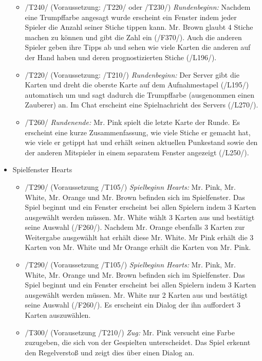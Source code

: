 \documentclass{article}
\begin{document}
\begin{itemize}
\begin{itemize}
		\item /T240/ (Voraussetzung: /T220/ oder /T230/) \textit{Rundenbeginn:} Nachdem eine Trumpffarbe angesagt wurde erscheint ein Fenster indem jeder Spieler die Anzahl seiner Stiche tippen kann. Mr. Brown glaubt 4 Stiche machen zu können und gibt die Zahl ein (/F370/). Auch die anderen Spieler geben ihre Tipps ab und sehen wie viele Karten die anderen auf der Hand haben und deren prognostizierten Stiche (/L196/).

		\item /T220/ (Voraussetzung: /T210/) \textit{Rundenbeginn:} Der Server gibt die Karten und dreht die oberste Karte auf dem Aufnahmestapel (/L195/) automatisch um und sagt dadurch die Trumpffarbe (ausgenommen einen Zauberer) an. Im Chat erscheint eine Spielnachricht des Servers (/L270/).
		
				\item /T260/ \textit{Rundenende:} Mr. Pink spielt die letzte Karte der Runde. Es erscheint eine kurze Zusammenfassung, wie viele Stiche er gemacht hat, wie viele er getippt hat und erhält seinen aktuellen Punkestand sowie den der anderen Mitspieler in einem separatem Fenster angezeigt (/L250/).
					
	\end{itemize}
	
	\item Spielfenster Hearts
	
	\begin{itemize}
	
		\item /T290/ (Voraussetzung /T105/) \textit{Spielbeginn Hearts:} Mr. Pink, Mr. White, Mr. Orange und Mr. Brown befinden sich im Spielfenster. Das Spiel beginnt und ein Fenster erscheint bei allen Spielern indem 3 Karten ausgewählt werden müssen. Mr. White wählt 3 Karten aus und bestätigt seine Auswahl (/F260/). Nachdem Mr. Orange ebenfalls 3 Karten zur Weitergabe ausgewählt hat erhält diese Mr. White. Mr Pink erhält die 3 Karten von Mr. White und  Mr Orange erhält die Karten von Mr. Pink.

		\item /T290/ (Voraussetzung /T105/) \textit{Spielbeginn Hearts:} Mr. Pink, Mr. White, Mr. Orange und Mr. Brown befinden sich im Spielfenster. Das Spiel beginnt und ein Fenster erscheint bei allen Spielern indem 3 Karten ausgewählt werden müssen. Mr. White nur 2 Karten aus und bestätigt seine Auswahl (/F260/). Es erscheint ein Dialog der ihn auffordert 3 Karten auszuwählen.

		\item /T300/ (Vorausetzung /T210/) \textit{Zug:} Mr. Pink versucht eine Farbe zuzugeben, die sich von der Gespielten unterscheidet. Das Spiel erkennt den Regelverstoß und zeigt dies über einen Dialog an.
	\end{itemize}
\end{itemize}
\end{document}
